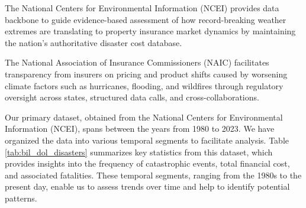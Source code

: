 \documentclass[12pt]{article}
\begin{document}
The National Centers for Environmental Information (NCEI) provides data backbone to guide evidence-based assessment of how record-breaking 
weather extremes are translating to property insurance market dynamics by maintaining the nation's authoritative disaster cost 
database.

The National Association of Insurance Commissioners (NAIC) facilitates transparency from insurers on pricing and product shifts caused by 
worsening climate factors such as hurricanes, flooding, and wildfires through regulatory oversight across states, structured data 
calls, and cross-collaborations.

Our primary dataset, obtained from the National Centers for Environmental Information (NCEI)\cite{ncei}, spans between the years from 
1980 to 2023. We have organized the data into various temporal segments to facilitate analysis. Table \ref{tab:bil_dol_disasters} 
summarizes key statistics from this dataset, which provides insights into the frequency of catastrophic events, total financial cost, and 
associated fatalities. These temporal segments, ranging from the 1980s to the present day, enable us to assess trends over time and 
help to identify potential patterns.

\begin{table}[h]
    \caption{NEIC: Billion-Dollar Disasters Data}
    \label{tab:bil_dol_disasters} 
    \centering
    \cite{ncei}
\end{table}
\end{document}
